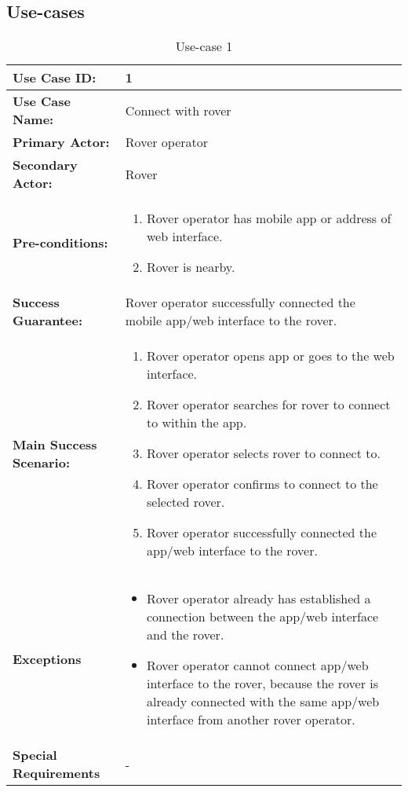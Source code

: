 \documentclass[12pt]{article}
\begin{document}
 	\subsection{Use-cases}
	 	\begin{table}[h]
	 	\centering
		 	\begin{tabularx}{\linewidth}{|X|X|}
		 		\hline
		 		\textbf{Use Case ID:} &1\\
		 		\hline
		 		\textbf{Use Case Name:} &Connect with rover\\
		 		\hline
		 		\textbf{Primary Actor:} &Rover operator\\
		 		\hline
		 		\textbf{Secondary Actor:} &Rover\\
		 		\hline
		 		\textbf{Pre-conditions:} &\begin{enumerate}
		 			\item Rover operator has mobile app or address of web interface.
		 			\item Rover is nearby.
		 		\end{enumerate}\\
		 		\hline
		 		\textbf{Success Guarantee:} &Rover operator successfully connected the mobile app/web interface to the rover. \\
		 		\hline 
		 		\textbf{Main Success Scenario:} &\begin{enumerate}
		 			\item Rover operator opens app or goes to the web interface.
		 			\item Rover operator searches for rover to connect to within the app.
		 			\item Rover operator selects rover to connect to.
		 			\item Rover operator confirms to connect to the selected rover.
		 			\item Rover operator successfully connected the app/web interface to the rover.
		 		\end{enumerate}\\
		 		\hline
		 		\textbf{Exceptions} &\begin{itemize}
		 			\item Rover operator already has established a connection between the app/web interface and the rover.
		 			\item Rover operator cannot connect app/web interface to the rover, because the rover is already connected with the same app/web interface from another rover operator.
		 			
		 		\end{itemize}\\
		 		\hline
		 		\textbf{Special Requirements} &- \\
		 		\hline
		 	\end{tabularx}
		 	\caption{Use-case 1}
		 	\label{table:Use-case1}   
	 	\end{table}
\end{document}
